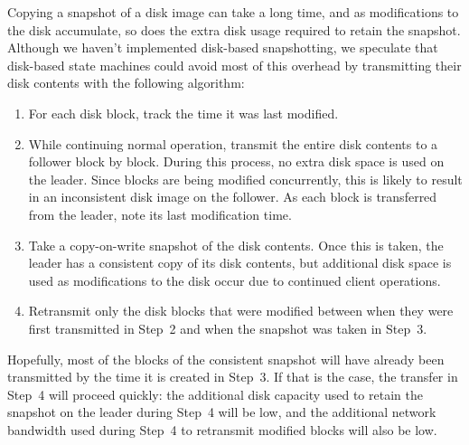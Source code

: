 Copying a snapshot of a disk image can take a long time, and as
modifications to the disk accumulate, so does the extra disk usage
required to retain the snapshot.
Although we haven't implemented disk-based snapshotting,
we speculate that disk-based state
machines could avoid most of this overhead by transmitting their disk
contents with the following algorithm:
%
\begin{enumerate}
%
\item For each disk block, track the time it was last modified.
%
\item While continuing normal operation, transmit the entire disk
contents to a follower block by block. During this process, no extra
disk space is used on the leader. Since blocks are being modified
concurrently, this is likely to result in an inconsistent disk image on
the follower. As each block is transferred from the leader, note its
last modification time.
%
\item Take a copy-on-write snapshot of the disk contents. Once this is
taken, the leader has a consistent copy of its disk contents, but
additional disk space is used as modifications to the disk occur due to
continued client operations.
%
\item Retransmit only the disk blocks that were modified between when
they were first transmitted in Step~2 and when the snapshot was taken in
Step~3.
%
\end{enumerate}
%
Hopefully, most of the blocks of the consistent snapshot will have
already been transmitted by the time it is created in Step~3. If that is
the case, the transfer in Step~4 will proceed quickly: the additional
disk capacity used to retain the snapshot on the leader during Step~4
will be low, and the additional network bandwidth used during Step~4 to
retransmit modified blocks will also be low.




